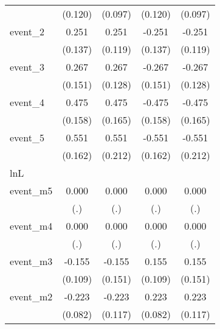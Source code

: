 {\begin{tabular}{l*{4}{c}}
            &     (0.120)         &     (0.097)         &     (0.120)         &     (0.097)         \\
[1em]
event\_2     &       0.251         &       0.251\sym{*}  &      -0.251         &      -0.251\sym{*}  \\
            &     (0.137)         &     (0.119)         &     (0.137)         &     (0.119)         \\
[1em]
event\_3     &       0.267         &       0.267\sym{*}  &      -0.267         &      -0.267\sym{*}  \\
            &     (0.151)         &     (0.128)         &     (0.151)         &     (0.128)         \\
[1em]
event\_4     &       0.475\sym{**} &       0.475\sym{**} &      -0.475\sym{**} &      -0.475\sym{**} \\
            &     (0.158)         &     (0.165)         &     (0.158)         &     (0.165)         \\
[1em]
event\_5     &       0.551\sym{***}&       0.551\sym{**} &      -0.551\sym{***}&      -0.551\sym{**} \\
            &     (0.162)         &     (0.212)         &     (0.162)         &     (0.212)         \\
\hline
lnL         &                     &                     &                     &                     \\
event\_m5    &       0.000         &       0.000         &       0.000         &       0.000         \\
            &         (.)         &         (.)         &         (.)         &         (.)         \\
[1em]
event\_m4    &       0.000         &       0.000         &       0.000         &       0.000         \\
            &         (.)         &         (.)         &         (.)         &         (.)         \\
[1em]
event\_m3    &      -0.155         &      -0.155         &       0.155         &       0.155         \\
            &     (0.109)         &     (0.151)         &     (0.109)         &     (0.151)         \\
[1em]
event\_m2    &      -0.223\sym{**} &      -0.223         &       0.223\sym{**} &       0.223         \\
            &     (0.082)         &     (0.117)         &     (0.082)         &     (0.117)         \\

\end{tabular}}
